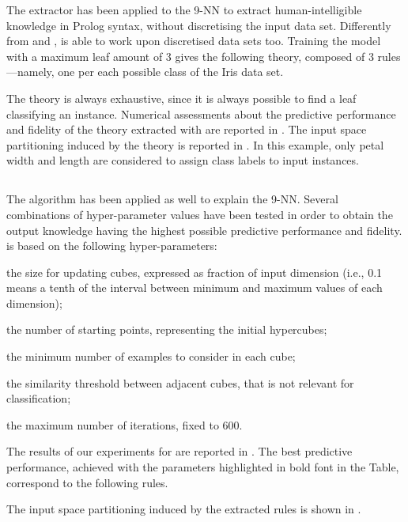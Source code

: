 \documentclass[
]{ceurart}
\begin{document}


The \cart{} extractor has been applied to the 9-NN to extract human-intelligible knowledge in Prolog syntax, without discretising the input data set.
%
Differently from \iter{} and \gridex{}, \cart{} is able to work upon discretised data sets too.
%
Training the model with a maximum leaf amount of 3 gives the following theory, composed of 3 rules---namely, one per each possible class of the Iris data set.



The theory is always exhaustive, since it is always possible to find a leaf classifying an instance.
%
Numerical assessments about the predictive performance and fidelity of the theory extracted with \cart{} are reported in .
%
The input space partitioning induced by the theory is reported in .
%
In this example, only petal width and length are considered to assign class labels to input instances.

\subsection{\iter{}}



The \iter{} algorithm has been applied as well to explain the 9-NN.
%
Several combinations of hyper-parameter values have been tested in order to obtain the output knowledge having the highest possible predictive performance and fidelity.
%
\iter{} is based on the following hyper-parameters:
%
\begin{inlinelist}
	\item the size for updating cubes, expressed as fraction of input dimension (i.e., 0.1 means a tenth of the interval between minimum and maximum values of each dimension);
	\item the number of starting points, representing the initial hypercubes;
	\item the minimum number of examples to consider in each cube;
	\item the similarity threshold between adjacent cubes, that is not relevant for classification;
	\item the maximum number of iterations, fixed to 600.
\end{inlinelist}

The results of our experiments for \iter{} are reported in .
%
The best predictive performance, achieved with the parameters highlighted in bold font in the Table, correspond to the following rules.
%

%
The input space partitioning induced by the extracted rules is shown in .
\end{document}
